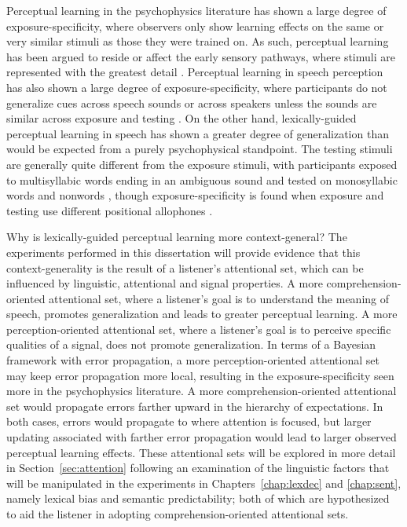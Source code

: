 Perceptual learning in the psychophysics literature has shown a large degree of exposure-specificity, where observers only show learning effects on the same or very similar stimuli as those they were trained on. 
As such, perceptual learning has been argued to reside or affect the early sensory pathways, where stimuli are represented with the greatest detail \citep{Gilbert2001}.  
Perceptual learning in speech perception has also shown a large degree of exposure-specificity, where participants do not generalize cues across speech sounds \citep{Reinisch2014} or across speakers unless the sounds are similar across exposure and testing \citep{Eisner2005, Kraljic2005, Kraljic2007, Reinisch2013a}.  
On the other hand, lexically-guided perceptual learning in speech has shown a greater degree of generalization than would be expected from a purely psychophysical standpoint.  
The testing stimuli are generally quite different from the exposure stimuli, with participants exposed to multisyllabic words ending in an ambiguous sound and tested on monosyllabic words \citep{Reinisch2013} and nonwords \citep{Norris2003, Kraljic2005}, though exposure-specificity is found when exposure and testing use different positional allophones \citep{Mitterer2013}.

Why is lexically-guided perceptual learning more context-general?
The experiments performed in this dissertation will provide evidence that this context-generality is the result of a listener's attentional set, which can be influenced by linguistic, attentional and signal properties.
A more comprehension-oriented attentional set, where a listener's goal is to understand the meaning of speech, promotes generalization and leads to greater perceptual learning.  
A more perception-oriented attentional set, where a listener's goal is to perceive specific qualities of a signal, does not promote generalization.
In terms of a Bayesian framework with error propagation, a more perception-oriented attentional set may keep error propagation more local, resulting in the exposure-specificity seen more in the psychophysics literature.
A more comprehension-oriented attentional set would propagate errors farther upward in the hierarchy of expectations.
In both cases, errors would propagate to where attention is focused, but larger updating associated with farther error propagation would lead to larger observed perceptual learning effects.
These attentional sets will be explored in more detail in Section~\ref{sec:attention} following an examination of the linguistic factors that will be manipulated in the experiments in Chapters~\ref{chap:lexdec} and \ref{chap:sent}, namely lexical bias and semantic predictability; both of which are hypothesized to aid the listener in adopting comprehension-oriented attentional sets.

